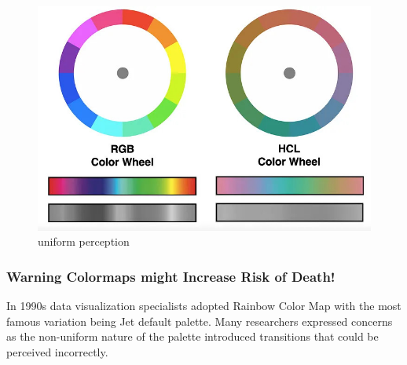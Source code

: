 \documentclass[
  letterpaper,
]{book}
\begin{document}
\begin{figure}

{\centering \includegraphics{./images/uniform_perception.jpg}

}

\caption{uniform perception}

\end{figure}

\hypertarget{warning-colormaps-might-increase-risk-of-death}{%
\subsubsection{Warning Colormaps might Increase Risk of
Death!}\label{warning-colormaps-might-increase-risk-of-death}}

In 1990s data visualization specialists adopted Rainbow Color Map with
the most famous variation being Jet default palette. Many researchers
expressed concerns as the non-uniform nature of the palette introduced
transitions that could be perceived incorrectly.
\end{document}
